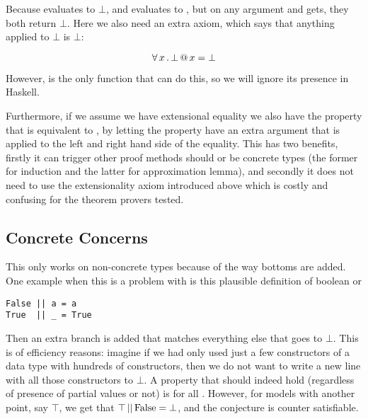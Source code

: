 Because  evaluates to $\bot$, and  evaluates
to \hs{()}, but on any argument  and  gets, they both
return $\bot$. Here we also need an extra axiom, which says that
anything applied to $\bot$ is $\bot$:

\begin{equation*}
\forall \, x \, . \, \bot \, @ \, x = \bot
\end{equation*}

However,  is the only function that can do this, so we will
ignore its presence in Haskell.

Furthermore, if we assume we have extensional equality we also have
the property that  is equivalent to
, by letting the property have an extra argument that
is applied to the left and right hand side of the equality. This has
two benefits, firstly it can trigger other proof methods should 
or  be concrete types (the former for induction and the latter
for approximation lemma), and secondly it does not need to use the
extensionality axiom introduced above which is costly and confusing
for the theorem provers tested.

\subsection{Concrete Concerns}

This only works on non-concrete types because of the way bottoms are
added. One example when this is a problem with is this plausible
definition of boolean or

\begin{verbatim}
False || a = a
True  || _ = True
\end{verbatim}

Then an extra branch is added that matches everything else that goes
to $\bot$. This is of efficiency reasons: imagine if we had only used
just a few constructors of a data type with hundreds of constructors,
then we do not want to write a new line with all those constructors to
$\bot$. A property that should indeed hold (regardless of presence of
partial values or not) is  for all
. However, for models with another point, say $\top$, we get
that $\top \, \mathrm{||} \, \mathrm{False} = \bot$, and the conjecture is
counter satisfiable.

